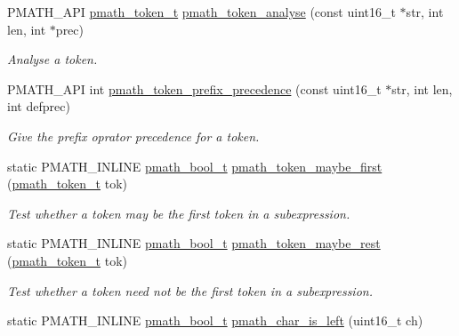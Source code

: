 \begin{CompactItemize}
PMATH\_\-API \hyperlink{group__parser_gfae0ba850f83a3a4560de57bee81e4b5}{pmath\_\-token\_\-t} \hyperlink{group__parser_g0cfde53ccdddc80d034dc5ee1ea54508}{pmath\_\-token\_\-analyse} (const uint16\_\-t $\ast$str, int len, int $\ast$prec)
\begin{CompactList}\small\item\em Analyse a token. \item\end{CompactList}\item 
PMATH\_\-API int \hyperlink{group__parser_g4e6cd1a92733aa00d32d48ac1e95aae2}{pmath\_\-token\_\-prefix\_\-precedence} (const uint16\_\-t $\ast$str, int len, int defprec)
\begin{CompactList}\small\item\em Give the prefix oprator precedence for a token. \item\end{CompactList}\item 
static PMATH\_\-INLINE \hyperlink{group__general__types_gc92090cb0b56345d6c379ed2341d4ef4}{pmath\_\-bool\_\-t} \hyperlink{group__parser_gb35bd0bbe60489c1169902df67c3714b}{pmath\_\-token\_\-maybe\_\-first} (\hyperlink{group__parser_gfae0ba850f83a3a4560de57bee81e4b5}{pmath\_\-token\_\-t} tok)
\begin{CompactList}\small\item\em Test whether a token may be the first token in a subexpression. \item\end{CompactList}\item 
static PMATH\_\-INLINE \hyperlink{group__general__types_gc92090cb0b56345d6c379ed2341d4ef4}{pmath\_\-bool\_\-t} \hyperlink{group__parser_g8e0466acaa70f215fa799cc547eadac4}{pmath\_\-token\_\-maybe\_\-rest} (\hyperlink{group__parser_gfae0ba850f83a3a4560de57bee81e4b5}{pmath\_\-token\_\-t} tok)
\begin{CompactList}\small\item\em Test whether a token need not be the first token in a subexpression. \item\end{CompactList}\item 
\hypertarget{group__parser_gc05d56bd068f696c5698dc7a11d5d292}{
static PMATH\_\-INLINE \hyperlink{group__general__types_gc92090cb0b56345d6c379ed2341d4ef4}{pmath\_\-bool\_\-t} \hyperlink{group__parser_gc05d56bd068f696c5698dc7a11d5d292}{pmath\_\-char\_\-is\_\-left} (uint16\_\-t ch)}
\label{group__parser_gc05d56bd068f696c5698dc7a11d5d292}


\end{CompactItemize}
